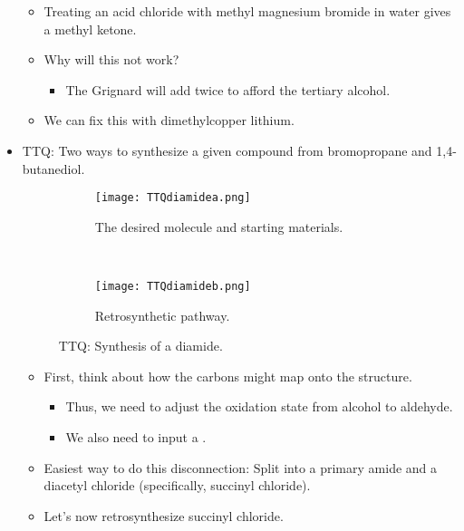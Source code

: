 \documentclass[../notes.tex]{subfiles}
\begin{document}
\begin{itemize}
\begin{figure}[h!]
    \end{figure}
    \begin{itemize}
        \item Treating an acid chloride with methyl magnesium bromide in water gives a methyl ketone.
        \item Why will this not work?
        \begin{itemize}
            \item The Grignard will add twice to afford the tertiary alcohol.
        \end{itemize}
        \item We can fix this with dimethylcopper lithium.
    \end{itemize}
    \item TTQ: Two ways to synthesize a given compound from bromopropane and 1,4-butanediol.
    \begin{figure}[H]
        \centering
        \begin{subfigure}[b]{\linewidth}
            \centering
            \texttt{[image: TTQdiamidea.png]}
            \caption{The desired molecule and starting materials.}
            \label{fig:TTQdiamidea}
        \end{subfigure}\\[2em]
        \begin{subfigure}[b]{\linewidth}
            \centering
            \texttt{[image: TTQdiamideb.png]}
            \caption{Retrosynthetic pathway.}
            \label{fig:TTQdiamideb}
        \end{subfigure}
        \caption{TTQ: Synthesis of a diamide.}
        \label{fig:TTQdiamide}
    \end{figure}
    \begin{itemize}
        \item First, think about how the carbons might map onto the structure.
        \begin{itemize}
            \item Thus, we need to adjust the oxidation state from alcohol to aldehyde.
            \item We also need to input a .
        \end{itemize}
        \item Easiest way to do this disconnection: Split into a primary amide and a diacetyl chloride (specifically, succinyl chloride).
        \item Let's now retrosynthesize succinyl chloride.
        \begin{itemize}

\end{itemize}
\end{itemize}
\end{itemize}
\end{document}
